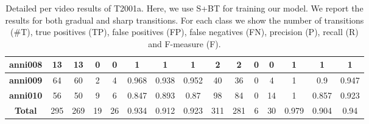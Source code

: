 \documentclass[journal]{IEEEtran}
\begin{document}
\begin{table*}[h]
\begin{tabular}{|c|c|c|c|c|c|c|c|c|c|c|c|c|c|c|}
\textbf{anni008}    & 13           & 13          & 0           & 0           & 1          & 1          & 1          & 2            & 2           & 0           & 0           & 1          & 1          & 1          \\ \hline
\textbf{anni009}    & 64           & 60          & 2           & 4           & 0.968      & 0.938      & 0.952      & 40           & 36          & 0           & 4           & 1          & 0.9        & 0.947      \\ \hline
\textbf{anni010}    & 56           & 50          & 9           & 6           & 0.847      & 0.893      & 0.87       & 98           & 84          & 0           & 14          & 1          & 0.857      & 0.923      \\ \hline
\textbf{Total}       & 295          & 269         & 19          & 26          & 0.934      & 0.912      & 0.923      & 311          & 281         & 6           & 30          & 0.979      & 0.904      & 0.94       \\ \hline
\end{tabular}
\caption{Detailed per video results of T2001a. Here, we use S+BT for training our model. We report the results for both gradual and sharp transitions. For each class we show the number of transitions (\#T), true positives (TP), false positives (FP), false negatives (FN), precision (P), recall (R) and F-measure (F).}
\label{2001a_01}
\end{table*}
\end{document}
